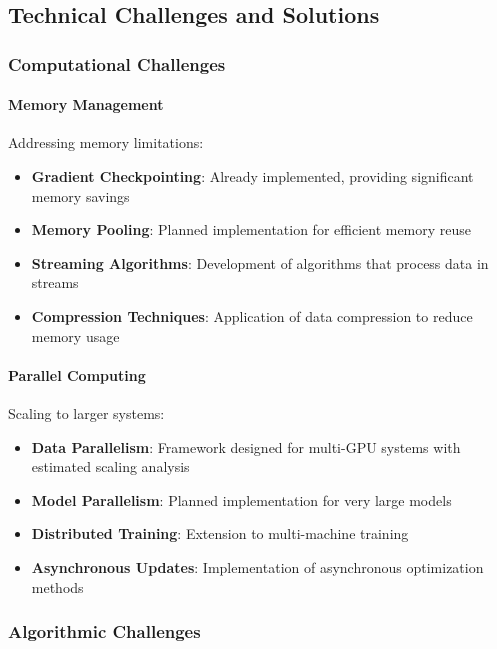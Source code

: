 \subsection{Technical Challenges and Solutions}

\subsubsection{Computational Challenges}

\paragraph{Memory Management}
Addressing memory limitations:

\begin{itemize}
    \item \textbf{Gradient Checkpointing}: Already implemented, providing significant memory savings
    \item \textbf{Memory Pooling}: Planned implementation for efficient memory reuse
    \item \textbf{Streaming Algorithms}: Development of algorithms that process data in streams
    \item \textbf{Compression Techniques}: Application of data compression to reduce memory usage
\end{itemize}

\paragraph{Parallel Computing}
Scaling to larger systems:

\begin{itemize}
    \item \textbf{Data Parallelism}: Framework designed for multi-GPU systems with estimated scaling analysis
    \item \textbf{Model Parallelism}: Planned implementation for very large models
    \item \textbf{Distributed Training}: Extension to multi-machine training
    \item \textbf{Asynchronous Updates}: Implementation of asynchronous optimization methods
\end{itemize}

\subsubsection{Algorithmic Challenges}

